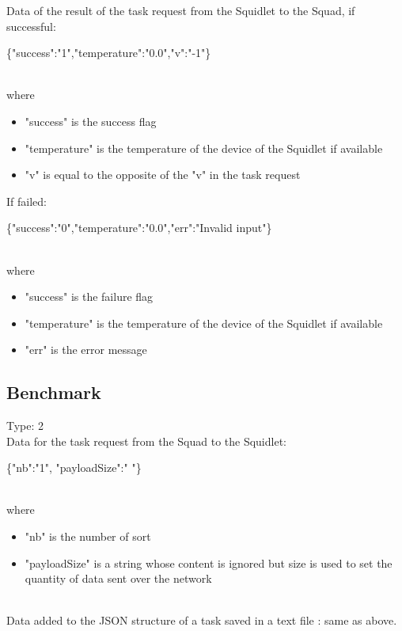 Data of the result of the task request from the Squidlet to the Squad, if successful:\\
\begin{ttfamily}\{"success":"1","temperature":"0.0","v":"-1"\}\end{ttfamily}\\
where
\begin{itemize}
\item "success" is the success flag
\item "temperature" is the temperature of the device of the Squidlet if available
\item "v" is equal to the opposite of the "v" in the task request
\end{itemize}
If failed:\\
\begin{ttfamily}\{"success":"0","temperature":"0.0","err":"Invalid input"\}\end{ttfamily}\\
where
\begin{itemize}
\item "success" is the failure flag
\item "temperature" is the temperature of the device of the Squidlet if available
\item "err" is the error message
\end{itemize}

\subsection{Benchmark}

Type: 2\\

Data for the task request from the Squad to the Squidlet:\\
\begin{ttfamily}\{"nb":"1", "payloadSize":" "\}\end{ttfamily}\\
where
\begin{itemize}
\item "nb" is the number of sort
\item "payloadSize" is a string whose content is ignored but size is used to set the quantity of data sent over the network
\end{itemize}\\

Data added to the JSON structure of a task saved in a text file : same as above.\\

